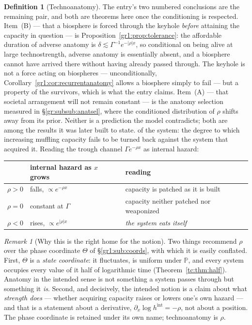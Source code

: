 \documentclass[11pt]{article}
\numberwithin{equation}{section}
\theoremstyle{plain}
\theoremstyle{definition}
\newtheorem{definition}[theorem]{Definition}
\theoremstyle{remark}
\newtheorem{remark}[theorem]{Remark}
\newcommand{\PP}{\mathbb{P}}
\begin{document}
\begin{definition}[Technoanatomy]
{The entry's two numbered conclusions are the remaining pair, and both
are theorems here once the conditioning is respected. Item~(B) --- that
a biosphere is forced through the keyhole \emph{before} attaining the
capacity in question --- is
Proposition~\ref{gr1:prop:tolerance}: the affordable duration of adverse
anatomy is $\delta\lesssim\Gamma^{-1}e^{-|\rho|x}$, so conditional on
being alive at large technostrength, adverse anatomy is essentially
absent, and a biosphere cannot have arrived there without having already
passed through. The keyhole is not a force acting on biospheres --- 
unconditionally, Corollary~\ref{gr1:cor:recurrentanatomy} allows a
biosphere simply to fail --- but a property of the survivors, which is
what the entry claims. Item~(A) --- that societal arrangement will not
remain constant --- is the anatomy selection measured in
\S\ref{gr:subsub:anatsel}, where the conditioned distribution of $\rho$
shifts away from its prior. Neither is a prediction the model
contradicts; both are among the results it was later built to state.}
of the system: the
degree to which increasing muffling capacity fails to be turned back
against the system that acquired it. Reading the trough channel
$\Gamma e^{-\rho x}$ as internal hazard:
\begin{center}\small
\begin{tabular}{@{}lll@{}}
\toprule
& internal hazard as $x$ grows & reading\\
\midrule
$\rho>0$ & falls, $\propto e^{-\rho x}$ & capacity is patched as it is
built\\
$\rho=0$ & constant at $\Gamma$ & capacity neither patched nor
weaponized\\
$\rho<0$ & rises, $\propto e^{|\rho|x}$ & \emph{the system eats itself}\\
\bottomrule
\end{tabular}
\end{center}
\end{definition}

\begin{remark}[Why this is the right home for the notion]
\label{gr1:rem:anatomyhome}
Two things recommend $\rho$ over the phase coordinate $\Theta$ of
\S\ref{gr1:sub:coords}, with which it is easily conflated.
First, $\Theta$ is a \emph{state coordinate}: it fluctuates, is uniform
under $\PP$, and every system occupies every value of it half of
logarithmic time (Theorem~\ref{tc:thm:half}). Anatomy in the intended
sense is not something a system passes through but something it
\emph{is}. Second, and decisively, the intended notion is a claim about
what \emph{strength does} --- whether acquiring capacity raises or
lowers one's own hazard --- and that is a statement about a derivative,
$\partial_x\log h^{\mathrm{int}} = -\rho$, not about a position. The
phase coordinate is retained under its own name; technoanatomy is
$\rho$.
\end{remark}
\end{document}

